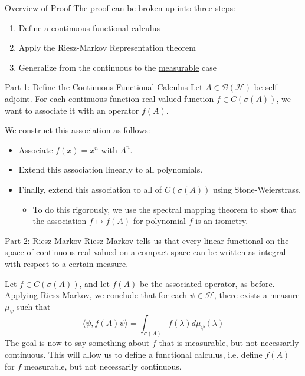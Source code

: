 \documentclass{beamer}
\theoremstyle{plain}
\theoremstyle{definition}
\renewcommand{\l}{\lambda}
\newcommand{\s}{\sigma}
\newcommand{\cB}{{\mathcal B}}
\newcommand{\cH}{{\mathcal H}}
\begin{document}
\begin{frame}{Overview of Proof}
    The proof can be broken up into three steps:
    \begin{enumerate}
        \item Define a \underline{continuous} functional calculus
        \item Apply the Riesz-Markov Representation theorem
        \item Generalize from the continuous to the \underline{measurable} case
    \end{enumerate}
\end{frame}


\begin{frame}{Part 1: Define the Continuous Functional Calculus}
    Let $A \in \cB(\cH)$ be self-adjoint. For each continuous function real-valued function $f \in C(\s(A))$, we want to associate it with an operator $f(A)$.

    \bigskip
    We construct this association as follows:
    \begin{itemize}
        \item Associate $f(x) = x^n$ with $A^n$.
        \item Extend this association linearly to all polynomials.
        \item Finally, extend this association to all of $C(\s(A))$ using Stone-Weierstrass.
            \begin{itemize}
                \item To do this rigorously, we use the spectral mapping theorem to show that the association $f \mapsto f(A)$ for polynomial $f$ is an isometry.
            \end{itemize}
    \end{itemize}
\end{frame}

\begin{frame}{Part 2: Riesz-Markov}
    Riesz-Markov tells us that every linear functional on the space of continuous real-valued on a compact space can be written as integral with respect to a certain measure.

    \medskip
    Let $f \in C(\s(A))$, and let $f(A)$ be the associated operator, as before. Applying Riesz-Markov, we conclude that for each $\psi \in \cH$, there exists a measure $\mu_\psi$ such that
    \[
        \langle \psi, f(A)\psi \rangle = \int_{\s(A)} f(\l)d\mu_\psi(\l)
    \]
    The goal is now to say something about $f$ that is measurable, but not necessarily continuous. This will allow us to define a functional calculus, i.e. define $f(A)$ for $f$ measurable, but not necessarily continuous.
\end{frame}
\end{document}
